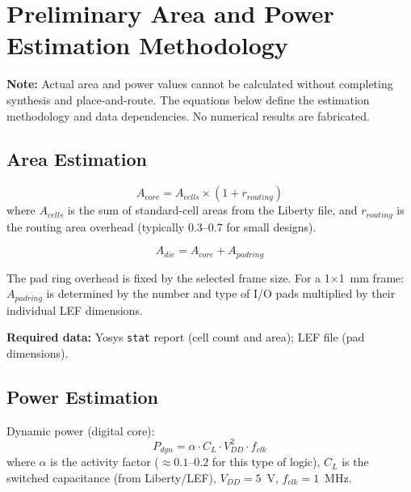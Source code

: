 \documentclass[11pt,a4paper]{article}
\begin{document}
\section{Preliminary Area and Power Estimation Methodology}

\begin{mdframed}[backgroundcolor=gray!10]
  \textbf{Note:} Actual area and power values cannot be calculated without completing synthesis
  and place-and-route. The equations below define the estimation methodology and data
  dependencies. No numerical results are fabricated.
\end{mdframed}

\subsection{Area Estimation}

\begin{equation}
  A_{core} = A_{cells} \times (1 + r_{routing})
\end{equation}
where $A_{cells}$ is the sum of standard-cell areas from the Liberty file, and $r_{routing}$ is
the routing area overhead (typically 0.3--0.7 for small designs).

\begin{equation}
  A_{die} = A_{core} + A_{padring}
\end{equation}

The pad ring overhead is fixed by the selected frame size. For a 1$\times$1~mm frame:
$A_{padring}$ is determined by the number and type of I/O pads multiplied by their individual
LEF dimensions.

\textbf{Required data:} Yosys \texttt{stat} report (cell count and area); LEF file (pad dimensions).

\subsection{Power Estimation}

Dynamic power (digital core):
\begin{equation}
  P_{dyn} = \alpha \cdot C_{L} \cdot V_{DD}^2 \cdot f_{clk}
\end{equation}
where $\alpha$ is the activity factor ($\approx 0.1$--$0.2$ for this type of logic),
$C_L$ is the switched capacitance (from Liberty/LEF), $V_{DD} = 5$~V, $f_{clk} = 1$~MHz.
\end{document}
